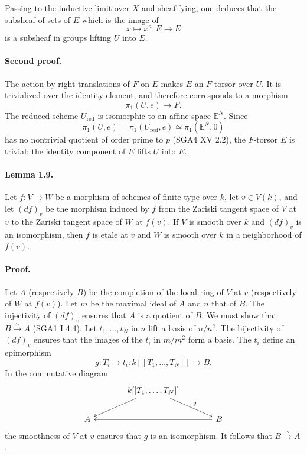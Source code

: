 \documentclass[11pt]{article}
\newcommand{\red}{\mathrm{red}}
\newcommand{\xiso}{\xrightarrow{\sim}}
\theoremstyle{plain}
\theoremstyle{definition}
\begin{document}
Passing to the inductive limit over $X$ and sheafifying, one deduces that the subsheaf of sets of $E$ which is the image of
\[
   x\longmapsto x^a:E\longrightarrow E
\]
is a subsheaf in groups lifting $U$ into $E$.

\paragraph{Second proof.} The action by right translations of $F$ on $E$ makes $E$ an $F$-torsor over $U$. It is trivialized over the identity element, and therefore corresponds to a morphism
\[
   \pi_1(U,e)\longrightarrow F.
\]
The reduced scheme $U_{\red}$ is isomorphic to an affine space $\mathbb E^N$. Since
\[
   \pi_1(U,e)=\pi_1(U_{\red},e)\simeq \pi_1(\mathbb E^N,0)
\]
has no nontrivial quotient of order prime to $p$ (SGA4 XV 2.2), the $F$-torsor $E$ is trivial: the identity component of $E$ lifts $U$ into $E$.

\paragraph{Lemma 1.9.} Let $f:V\to W$ be a morphism of schemes of finite type over $k$, let $v\in V(k)$, and let $(df)_v$ be the morphism induced by $f$ from the Zariski tangent space of $V$ at $v$ to the Zariski tangent space of $W$ at $f(v)$. If $V$ is smooth over $k$ and $(df)_v$ is an isomorphism, then $f$ is etale at $v$ and $W$ is smooth over $k$ in a neighborhood of $f(v)$.

\paragraph{Proof.} Let $A$ (respectively $B$) be the completion of the local ring of $V$ at $v$ (respectively of $W$ at $f(v)$). Let $m$ be the maximal ideal of $A$ and $n$ that of $B$. The injectivity of $(df)_v$ ensures that $A$ is a quotient of $B$. We must show that $B\xiso{}A$ (SGA1 I 4.4). Let $t_1,\ldots,t_N$ in $n$ lift a basis of $n/n^2$. The bijectivity of $(df)_v$ ensures that the images of the $t_i$ in $m/m^2$ form a basis. The $t_i$ define an epimorphism
\[
   g:T_i\mapsto t_i:k[[T_1,\ldots,T_N]]\longrightarrow B.
\]
In the commutative diagram
\[
\begin{tikzcd}[column sep=large]
& k[[T_1,\ldots,T_N]] \arrow[dl] \arrow[dr,"g"] & \\
A & & B \arrow[ll]
\end{tikzcd}
\]
the smoothness of $V$ at $v$ ensures that $g$ is an isomorphism. It follows that $B\xiso{}A$.
\end{document}
